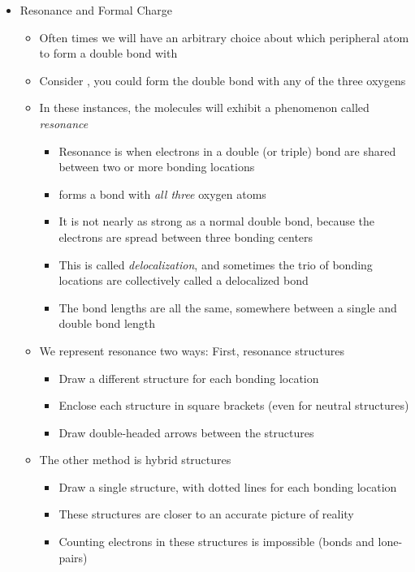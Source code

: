 \documentclass[12pt, openany, letterpaper]{memoir}
\begin{document}
\begin{itemize}
  \item Resonance and Formal Charge
    \begin{itemize}
      \item Often times we will have an arbitrary choice about which peripheral atom to form a double bond with
      \item Consider , you could form the double bond with any of the three oxygens
      \item In these instances, the molecules will exhibit a phenomenon called \emph{resonance}
            \begin{itemize}
              \item Resonance is when electrons in a double (or triple) bond are shared between two or more bonding locations
              \item {} forms a bond with \emph{all three} oxygen atoms
              \item It is not nearly as strong as a normal double bond, because the electrons are spread between three bonding centers
              \item This is called \emph{delocalization}, and sometimes the trio of bonding locations are collectively called a delocalized bond
              \item The bond lengths are all the same, somewhere between a single and double bond length
            \end{itemize}
      \item We represent resonance two ways: First, resonance structures
            \begin{itemize}
              \item Draw a different structure for each bonding location
              \item Enclose each structure in square brackets (even for neutral structures)
              \item Draw double-headed arrows between the structures
            \end{itemize}
      \item The other method is hybrid structures
            \begin{itemize}
              \item Draw a single structure, with dotted lines for each bonding location
              \item These structures are closer to an accurate picture of reality
              \item Counting electrons in these structures is impossible (bonds and lone-pairs)
            \end{itemize}


\end{itemize}
\end{itemize}
\end{document}

